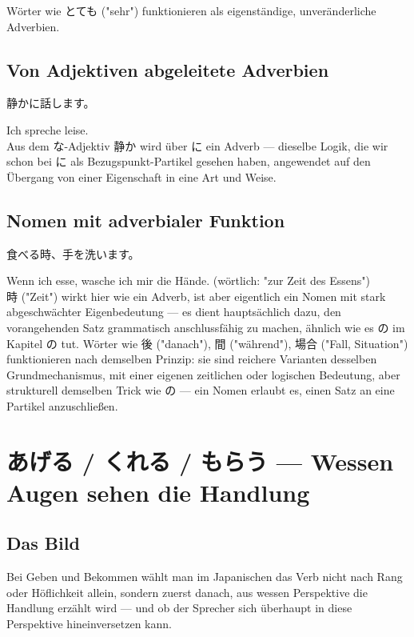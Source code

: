 \documentclass[12pt]{book}
\begin{document}
Wörter wie とても ("sehr") funktionieren als eigenständige, unveränderliche Adverbien.

\section*{Von Adjektiven abgeleitete Adverbien}

\par\quad 静かに話します。\\
\par\quad Ich spreche leise.\\

Aus dem な-Adjektiv 静か wird über に ein Adverb — dieselbe Logik, die wir schon bei に als Bezugspunkt-Partikel gesehen haben, angewendet auf den Übergang von einer Eigenschaft in eine Art und Weise.

\section*{Nomen mit adverbialer Funktion}

\par\quad 食べる時、手を洗います。\\
\par\quad Wenn ich esse, wasche ich mir die Hände. (wörtlich: "zur Zeit des Essens")\\

時 ("Zeit") wirkt hier wie ein Adverb, ist aber eigentlich ein Nomen mit stark abgeschwächter Eigenbedeutung — es dient hauptsächlich dazu, den vorangehenden Satz grammatisch anschlussfähig zu machen, ähnlich wie es の im Kapitel の tut. Wörter wie 後 ("danach"), 間 ("während"), 場合 ("Fall, Situation") funktionieren nach demselben Prinzip: sie sind reichere Varianten desselben Grundmechanismus, mit einer eigenen zeitlichen oder logischen Bedeutung, aber strukturell demselben Trick wie の — ein Nomen erlaubt es, einen Satz an eine Partikel anzuschließen.


\chapter{あげる / くれる / もらう — Wessen Augen sehen die Handlung}

\section*{Das Bild}

Bei Geben und Bekommen wählt man im Japanischen das Verb nicht nach Rang oder Höflichkeit allein, sondern zuerst danach, aus wessen Perspektive die Handlung erzählt wird — und ob der Sprecher sich überhaupt in diese Perspektive hineinversetzen kann.
\end{document}

